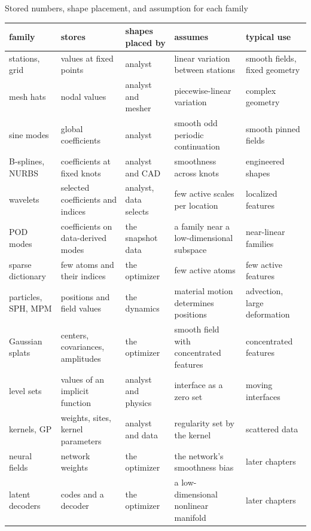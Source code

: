 \documentclass[aspectratio=169]{beamer}
\begin{document}
\begin{frame}{Stored numbers, shape placement, and assumption for each family}
\tiny
\renewcommand{\arraystretch}{1.15}
\begin{tabular}{@{}p{2.6cm}p{3.5cm}p{2.3cm}p{4.2cm}p{2.4cm}@{}}
\toprule
family & stores & shapes placed by & assumes & typical use \\
\midrule
stations, grid & values at fixed points & analyst & linear variation between stations & smooth fields, fixed geometry \\
mesh hats & nodal values & analyst and mesher & piecewise-linear variation & complex geometry \\
sine modes & global coefficients & analyst & smooth odd periodic continuation & smooth pinned fields \\
B-splines, NURBS & coefficients at fixed knots & analyst and CAD & smoothness across knots & engineered shapes \\
wavelets & selected coefficients and indices & analyst, data selects & few active scales per location & localized features \\
POD modes & coefficients on data-derived modes & the snapshot data & a family near a low-dimensional subspace & near-linear families \\
sparse dictionary & few atoms and their indices & the optimizer & few active atoms & few active features \\
particles, SPH, MPM & positions and field values & the dynamics & material motion determines positions & advection, large deformation \\
Gaussian splats & centers, covariances, amplitudes & the optimizer & smooth field with concentrated features & concentrated features \\
level sets & values of an implicit function & analyst and physics & interface as a zero set & moving interfaces \\
kernels, GP & weights, sites, kernel parameters & analyst and data & regularity set by the kernel & scattered data \\
neural fields & network weights & the optimizer & the network's smoothness bias & later chapters \\
latent decoders & codes and a decoder & the optimizer & a low-dimensional nonlinear manifold & later chapters \\
\bottomrule
\end{tabular}
\end{frame}
\end{document}
